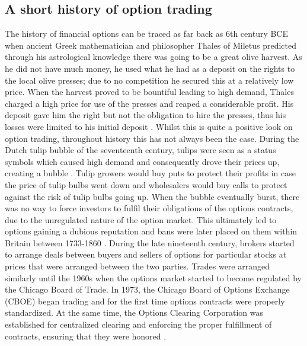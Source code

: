 \subsection{A short history of option trading}
The history of financial options can be traced as far back as 6th century BCE when ancient Greek mathematician and philosopher Thales of Miletus predicted through his astrological knowledge there was going to be a great olive harvest. As he did not have much money, he used what he had as a deposit on the rights to the local olive presses; due to no competition he secured this at a relatively low price. When the harvest proved to be bountiful leading to high demand, Thales charged a high price for use of the presses and reaped a considerable profit. His deposit gave him the right but not the obligation to hire the presses, thus his losses were limited to his initial deposit \cite{OptionFirst, 1877aristotle}.
\nline{}
Whilst this is quite a positive look on option trading, throughout history this has not always been the case. During the Dutch tulip bubble of the seventeenth century, tulips were seen as a status symbols which caused high demand and consequently drove their prices up, creating a bubble \cite{dash2011tulipomania}. Tulip growers would buy puts to protect their profits in case the price of tulip bulbs went down and wholesalers would buy calls to protect against the risk of tulip bulbs going up. When the bubble eventually burst, there was no way to force investors to fulfil their obligations of the options contracts, due to the unregulated nature of the option market. This ultimately led to options gaining a dubious reputation and bans were later placed on them within Britain between 1733-1860 \cite{OptionBan}. 
\nline{}
During the late nineteenth century, brokers started to arrange deals between buyers and sellers of options for particular stocks at prices that were arranged between the two parties. Trades were arranged similarly until the 1960s when the options market started to become regulated by the Chicago Board of Trade. In 1973, the Chicago Board of Options Exchange (CBOE) began trading and for the first time options contracts were properly standardized. At the same time, the Options Clearing Corporation was established for centralized clearing and enforcing the proper fulfillment of contracts, ensuring that they were honored \cite{markham2002financial}.


